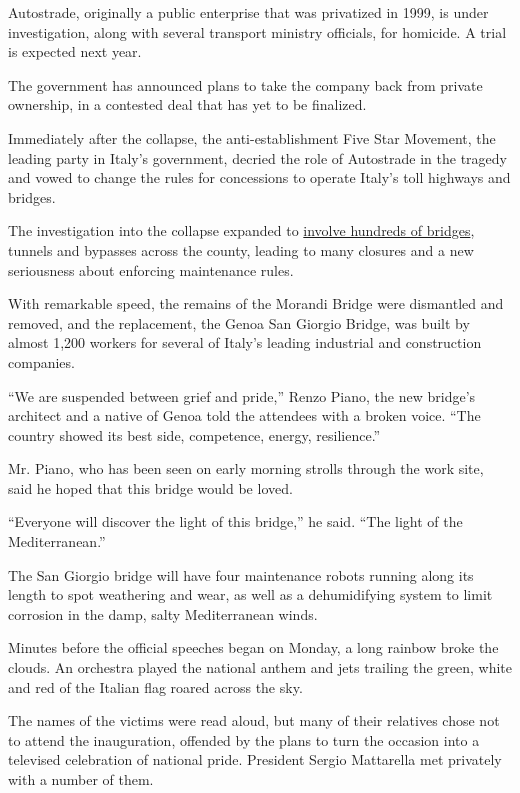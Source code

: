 Autostrade, originally a public enterprise that was privatized in 1999,
is under investigation, along with several transport ministry officials,
for homicide. A trial is expected next year.

The government has announced plans to take the company back from private
ownership, in a contested deal that has yet to be finalized.

Immediately after the collapse, the anti-establishment Five Star
Movement, the leading party in Italy's government, decried the role of
Autostrade in the tragedy and vowed to change the rules for concessions
to operate Italy's toll highways and bridges.

The investigation into the collapse expanded to
\href{https://www.nytimes.com/interactive/2018/09/06/world/europe/genoa-italy-bridge.html}{involve
hundreds of bridges}, tunnels and bypasses across the county, leading to
many closures and a new seriousness about enforcing maintenance rules.

With remarkable speed, the remains of the Morandi Bridge were dismantled
and removed, and the replacement, the Genoa San Giorgio Bridge, was
built by almost 1,200 workers for several of Italy's leading industrial
and construction companies.

``We are suspended between grief and pride,'' Renzo Piano, the new
bridge's architect and a native of Genoa told the attendees with a
broken voice. ``The country showed its best side, competence, energy,
resilience.''

Mr. Piano, who has been seen on early morning strolls through the work
site, said he hoped that this bridge would be loved.

``Everyone will discover the light of this bridge,'' he said. ``The
light of the Mediterranean.''

The San Giorgio bridge will have four maintenance robots running along
its length to spot weathering and wear, as well as a dehumidifying
system to limit corrosion in the damp, salty Mediterranean winds.

Minutes before the official speeches began on Monday, a long rainbow
broke the clouds. An orchestra played the national anthem and jets
trailing the green, white and red of the Italian flag roared across the
sky.

The names of the victims were read aloud, but many of their relatives
chose not to attend the inauguration, offended by the plans to turn the
occasion into a televised celebration of national pride. President
Sergio Mattarella met privately with a number of them.

